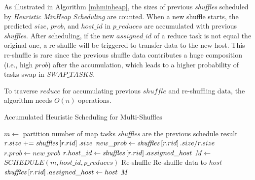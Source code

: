 As illustrated in Algorithm \ref{mhminheap}, the sizes of previous \textit{shuffles} scheduled by \textit{Heuristic MinHeap Scheduling} are counted. 
When a new shuffle starts, the predicted $size$, $prob$, and $host\_id$ in $p\_reduces$ are accumulated with previous \textit{shuffles}. 
After scheduling, if the new $assigned\_id$ of a reduce task is not equal the original one, a re-shuffle will be triggered to transfer data to the new host. 
This re-shuffle is rare since the previous shuffle data contributes a huge composition (i.e., high $prob$) after the accumulation, 
which leads to a higher probability of tasks swap in $SWAP\_TASKS$. 

To traverse $reduce$ for accumulating previous $shuffle$ and re-shuffling data, the algorithm needs $O(n)$ operations.

\begin{minipage}{0.95\columnwidth}
	\begin{algorithm}[H]
	\caption{Accumulated Heuristic Scheduling for Multi-Shuffles}
	\label{mhminheap}
		\begin{algorithmic}[1]
		\small
			\State $m\gets$ partition number of map tasks
			\Comment \textit{shuffles} are the previous schedule result 
				\State $r.size \mathrel{+}= \text{\textit{shuffles}}\left[r.rid\right].size$
				\State $new\_prob\gets \text{\textit{shuffles}}\left[r.rid\right].size / r.size$
					\State $r.prob\gets new\_prob$
					\State $r.host\_id\gets \text{\textit{shuffles}}\left[r.rid\right].assigned\_host$
				\EndIf
			\EndFor
			\State $M\gets$ $SCHEDULE\left(m, host\_id, p\_reduces\right)$
				\Comment Re-shuffle
					\State Re-shuffle data to $host$
					\State $\text{\textit{shuffles}}\left[r.rid\right].assigned\_host\gets host$
					\EndIf
				\EndFor
			\EndFor
			\Return $M$
		\EndProcedure
		\end{algorithmic}
	\end{algorithm}
\end{minipage}
